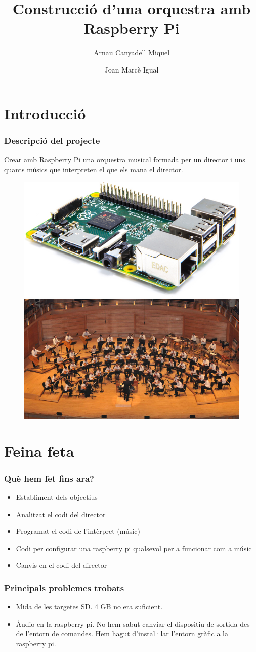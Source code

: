 \documentclass{beamer}
\title{Construcció d'una orquestra amb Raspberry Pi}
\author{Arnau Canyadell Miquel \and Joan Marcè Igual}
\begin{document}
\frame{\titlepage}
\section{Introducció}

\begin{frame}
	\frametitle{Descripció del projecte}
	Crear amb Raspberry Pi una orquestra musical formada per un director i uns quants músics que interpreten el que els mana el director.
	\begin{figure}
		\includegraphics[width=0.475\linewidth]{images/raspberry}
		\hfill
		\includegraphics[width=0.475\linewidth]{images/orchestra}
	\end{figure}
\end{frame}

\section{Feina feta}
\begin{frame}
	\frametitle{Què hem fet fins ara?}
	\begin{itemize}[<+->]
		\item Establiment dels objectius
		\item Analitzat el codi del director
		\item Programat el codi de l'intèrpret (músic)
		\item Codi per configurar una raspberry pi qualsevol per a funcionar com a músic
		\item Canvis en el codi del director
	\end{itemize}
\end{frame}

\begin{frame}
	\frametitle{Principals problemes trobats}
	\begin{itemize}[<+->]
		\item Mida de les targetes SD. 4 GB no era suficient.
		\item Àudio en la raspberry pi. No hem sabut canviar el dispositiu de sortida des de l'entorn de comandes. Hem hagut d'instal·lar l'entorn gràfic a la raspberry pi.
	\end{itemize}
\end{frame}
\end{document}
